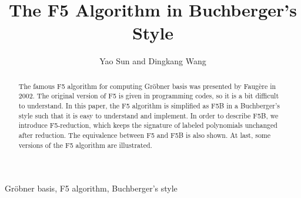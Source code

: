 \documentclass[preprint,authoryear,3p,12pt]{elsarticle}
\def\gr{{Gr\"obner }}
\begin{document}
\begin{frontmatter}



\title{The F5 Algorithm in Buchberger's Style}


\author{Yao Sun and Dingkang Wang}


\address{Key Laboratory of Mathematics Mechanization, Academy of Mathematics and Systems Science, CAS, Beijing 100190,  China}


\begin{abstract}
The famous F5 algorithm for computing \gr basis was presented by Faug\`ere in 2002. The original version of  F5 is given in
programming codes, so it is a bit difficult to understand. In this paper, the F5 algorithm is simplified as F5B in a Buchberger's
style such that it is easy to understand and implement. In order to describe F5B, we introduce F5-reduction, which keeps the
signature of labeled polynomials unchanged after reduction. The equivalence between F5 and F5B is also shown. At last, some
versions of the F5 algorithm are illustrated.
\end{abstract}

\begin{keyword}
\gr basis, F5 algorithm, Buchberger's style

\end{keyword}

\end{frontmatter}
\end{document}
